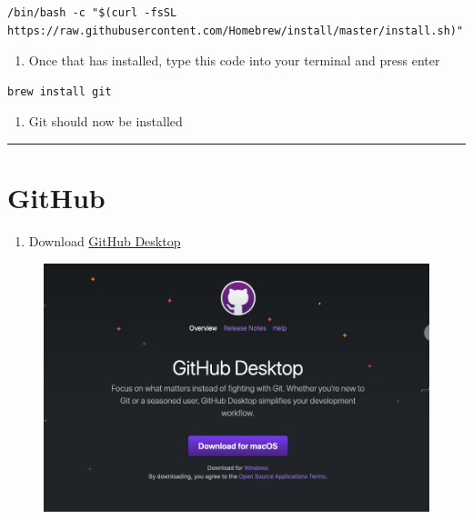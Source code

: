 \documentclass[]{book}
\providecommand{\tightlist}{%
  \setlength{\itemsep}{0pt}\setlength{\parskip}{0pt}}
\begin{document}
\begin{verbatim}
/bin/bash -c "$(curl -fsSL https://raw.githubusercontent.com/Homebrew/install/master/install.sh)"
\end{verbatim}

\begin{enumerate}
\def\labelenumi{\arabic{enumi}.}
\setcounter{enumi}{2}
\tightlist
\item
  Once that has installed, type this code into your terminal and press enter
\end{enumerate}

\begin{verbatim}
brew install git
\end{verbatim}

\begin{enumerate}
\def\labelenumi{\arabic{enumi}.}
\setcounter{enumi}{3}
\tightlist
\item
  Git should now be installed
\end{enumerate}

\begin{center}\rule{0.5\linewidth}{0.5pt}\end{center}

\hypertarget{github-1}{%
\section{GitHub}\label{github-1}}

\begin{enumerate}
\def\labelenumi{\arabic{enumi}.}
\tightlist
\item
  Download \href{https://desktop.github.com/}{GitHub Desktop}
\end{enumerate}

\begin{figure}
\centering
\includegraphics{images/research_protocols/github/1.png}
\caption{}
\end{figure}
\end{document}

